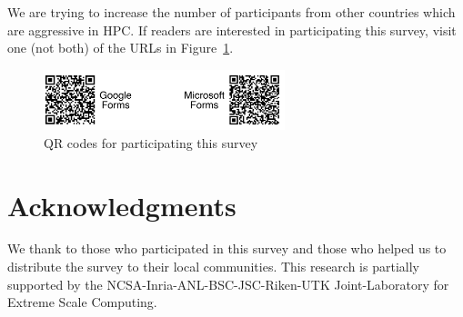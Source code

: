 \documentclass[sigconf,nonacm]{acmart}
\begin{document}
We are trying to increase the number of participants from other 
countries which are aggressive in HPC.  
If readers are interested in participating this survey,
visit one (not both) of the URLs in
Figure~\ref{fig:qrcodes}.  

\begin{figure}[htb]
\begin{center}
\includegraphics[width=7cm]{figs/QR-codes.pdf}
\vspace{-3mm}
\caption{QR codes for participating this survey}
\label{fig:qrcodes}
\end{center}
\vspace{-5mm}
\end{figure}

\section*{Acknowledgments}
{\small
We thank to those who participated in this survey and those who
helped us to distribute the survey to their local communities. 
This research is partially supported by the
NCSA-Inria-ANL-BSC-JSC-Riken-UTK Joint-Laboratory for Extreme Scale
Computing\cite{JLESC}.
}


\end{document}
